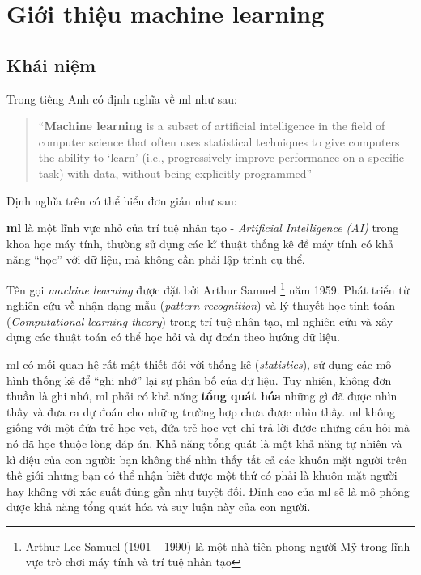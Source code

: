 \documentclass[../main-report.tex]{subfiles}
\begin{document}
\section{Giới thiệu machine learning}
\subsection{Khái niệm}
Trong tiếng Anh có định nghĩa về \gls{ml} như sau:

\begin{quote}
``\textbf{Machine learning} is a subset of artificial intelligence in the field of computer science that often uses statistical techniques to give computers the ability to `learn' (i.e., progressively improve performance on a specific task) with data, without being explicitly programmed'' \citep{samuel1959some}
\end{quote}

Định nghĩa trên có thể hiểu đơn giản như sau: 

\textbf{\Gls{ml}} là một lĩnh vực nhỏ của trí tuệ nhân tạo - \emph{Artificial Intelligence (AI)} trong khoa học máy tính, thường sử dụng các kĩ thuật thống kê để máy tính có khả năng ``học'' với dữ liệu, mà không cần phải lập trình cụ thể.

Tên gọi \emph{machine learning} được đặt bởi Arthur Samuel \footnote{Arthur Lee Samuel (1901 – 1990) là một nhà tiên phong người Mỹ trong lĩnh vực trò chơi máy tính và trí tuệ nhân tạo} năm 1959. Phát triển từ nghiên cứu về nhận dạng mẫu (\emph{pattern recognition}) và lý thuyết học tính toán (\emph{Computational learning theory}) trong trí tuệ nhân tạo, \gls{ml} nghiên cứu và xây dựng các thuật toán có thể học hỏi và dự đoán theo hướng dữ liệu.

\Gls{ml} có mối quan hệ rất mật thiết đối với thống kê (\textit{statistics}), sử dụng các mô hình thống kê để ``ghi nhớ'' lại sự phân bố của dữ liệu. Tuy nhiên, không đơn thuần là ghi nhớ, \gls{ml} phải có khả năng \textbf{tổng quát hóa} những gì đã được nhìn thấy và đưa ra dự đoán cho những trường hợp chưa được nhìn thấy. \Gls{ml} không giống với một đứa trẻ học vẹt, đứa trẻ học vẹt chỉ trả lời được những câu hỏi mà nó đã học thuộc lòng đáp án. Khả năng tổng quát là một khả năng tự nhiên và kì diệu của con người: bạn không thể nhìn thấy tất cả các khuôn mặt người trên thế giới nhưng bạn có thể nhận biết được một thứ có phải là khuôn mặt người hay không với xác suất đúng gần như tuyệt đối. Đỉnh cao của \gls{ml} sẽ là mô phỏng được khả năng tổng quát hóa và suy luận này của con người.
\end{document}
